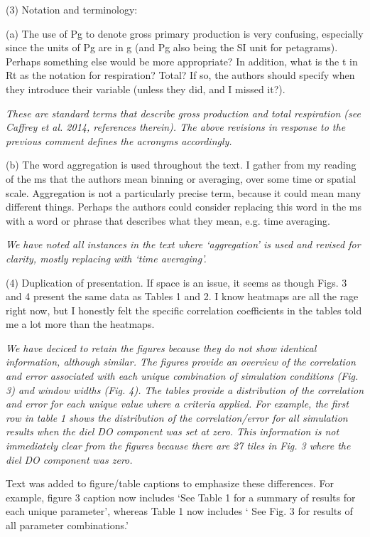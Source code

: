 \documentclass[letterpaper,12pt]{article}\usepackage[]{graphicx}\usepackage[]{color}
\begin{document}
(3) Notation and terminology:

(a) The use of Pg to denote gross primary production is very confusing, especially since the units of Pg are in g (and Pg also being the SI unit for petagrams). Perhaps something else would be more appropriate? In addition, what is the t in Rt as the notation for respiration? Total? If so, the authors should specify when they introduce their variable (unless they did, and I missed it?).

{\it These are standard terms that describe gross production and total respiration (see Caffrey et al. 2014, references therein).  The above revisions in response to the previous comment defines the acronyms accordingly.}

(b) The word aggregation is used throughout the text. I gather from my reading of the ms that the authors mean binning or averaging, over some time or spatial scale. Aggregation is not a particularly precise term, because it could mean many different things. Perhaps the authors could consider replacing this word in the ms with a word or phrase that describes what they mean, e.g. time averaging.

{\it We have noted all instances in the text where `aggregation' is used and revised for clarity, mostly replacing with `time averaging'.}

(4) Duplication of presentation. If space is an issue, it seems as though Figs. 3 and 4 present the same data as Tables 1 and 2. I know heatmaps are all the rage right now, but I honestly felt the specific correlation coefficients in the tables told me a lot more than the heatmaps.

{\it We have deciced to retain the figures because they do not show identical information, although similar.  The figures provide an overview of the correlation and error associated with each unique combination of simulation conditions (Fig. 3) and window widths (Fig. 4).  The tables provide a distribution of the correlation and error for each unique value where a criteria applied.  For example, the first row in table 1 shows the distribution of the correlation/error for all simulation results when the diel DO component was set at zero.  This information is not immediately clear from the figures because there are 27 tiles in Fig. 3 where the diel DO component was zero.

Text was added to figure/table captions to emphasize these differences.  For example, figure 3 caption now includes `See Table 1 for a summary of results for each unique parameter', whereas Table 1 now includes ` See Fig. 3 for results of all parameter combinations.'
}
\end{document}
